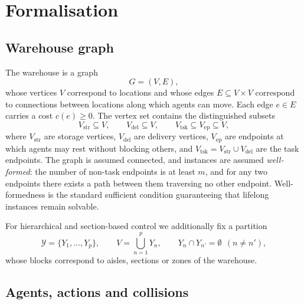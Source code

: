 \section{Formalisation}

\subsection{Warehouse graph}

The warehouse is a graph
\begin{equation}
  G = (V, E),
\end{equation}
whose vertices \( V \) correspond to locations and whose edges
\( E \subseteq V \times V \) correspond to connections between locations
along which agents can move. Each edge \( e \in E \) carries a cost
\( c(e) \geq 0 \). The vertex set contains the distinguished subsets
\begin{equation}
  V_{\mathrm{str}} \subseteq V, \qquad
  V_{\mathrm{del}} \subseteq V, \qquad
  V_{\mathrm{tsk}} \subseteq V_{\mathrm{ep}} \subseteq V,
\end{equation}
where \( V_{\mathrm{str}} \) are storage vertices, \( V_{\mathrm{del}} \) are
delivery vertices, \( V_{\mathrm{ep}} \) are endpoints at which agents may
rest without blocking others, and \( V_{\mathrm{tsk}} = V_{\mathrm{str}} \cup
V_{\mathrm{del}} \) are the task endpoints. The graph is assumed connected,
and instances are assumed \emph{well-formed}: the number of non-task
endpoints is at least \( m \), and for any two endpoints there exists a path
between them traversing no other endpoint. Well-formedness is the standard
sufficient condition guaranteeing that lifelong instances remain solvable.

For hierarchical and section-based control we additionally fix a partition
\begin{equation}
  \mathcal{Y} = \{Y_1, \dots, Y_p\}, \qquad
  V = \bigcup_{n=1}^{p} Y_n, \qquad
  Y_n \cap Y_{n'} = \emptyset \ \ (n \neq n'),
\end{equation}
whose blocks correspond to aisles, sections or zones of the warehouse.

\subsection{Agents, actions and collisions}

